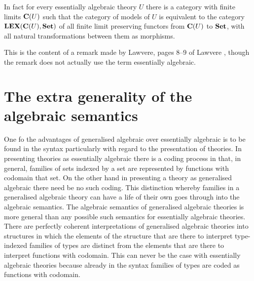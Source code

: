In fact for every essentially algebraic theory $U$ there is a category with finite limits $\mathbf{C}(U)$ such that the category of models of $U$ is equivalent to the category $\mathbf{LEX}(\mathbf{C}(U),\mathbf{Set})$ of all finite limit preserving functors from $\mathbf{C}(U)$ to $\mathbf{Set}$, with all natural transformations between them as morphisms.

This is the content of a remark made by Lawvere, pages 8--9 of Lawvere \cite{lawvere:17}, though the remark does not actually use the term essentially algebraic.

\section{The extra generality of the algebraic semantics} \label{sec:source-1-5}
One fo the advantages of generalised algebraic over essentially algebraic is to be found in the syntax particularly with regard to the presentation of theories.
%
In presenting theories as essentially algebraic there is a coding process in that, in general, families of sets indexed by a set are represented by functions with codomain that set.
%
On the other hand in presenting a theory as generalised algebraic there need be no such coding.
%
This distinction whereby families in a generalised algebraic theory can have a life of their own goes through into the algebraic semantics.
%
The algebraic semantics of generalised algebraic theories is more general than any possible such semantics for essentially algebraic theories.
%
There are perfectly coherent interpretations of generalised algebraic theories into structures in which the elements of the structure that are there to interpret type-indexed families of types are distinct from the elements that are there to interpret functions with codomain.
%
This can never be the case with essentially algebraic theories because already in the syntax families of types are coded as functions with codomain.


